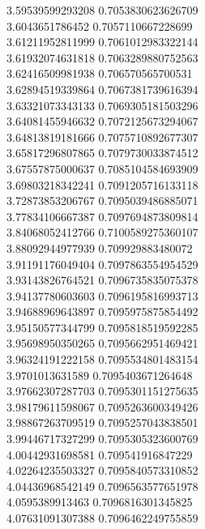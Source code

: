 {3.59539599293208 0.7053830623626709 \\
3.6043651786452 0.7057110667228699 \\
3.61211952811999 0.7061012983322144 \\
3.61932074631818 0.7063289880752563 \\
3.62416509981938 0.706570565700531 \\
3.62894519339864 0.7067381739616394 \\
3.63321073343133 0.7069305181503296 \\
3.64081455946632 0.7072125673294067 \\
3.64813819181666 0.7075710892677307 \\
3.65817296807865 0.7079730033874512 \\
3.67557875000637 0.7085104584693909 \\
3.69803218342241 0.7091205716133118 \\
3.72873853206767 0.7095039486885071 \\
3.77834106667387 0.7097694873809814 \\
3.84068052412766 0.7100589275360107 \\
3.88092944977939 0.709929883480072 \\
3.91191176049404 0.7097863554954529 \\
3.93143826764521 0.7096735835075378 \\
3.94137780603603 0.7096195816993713 \\
3.94688969643897 0.7095975875854492 \\
3.95150577344799 0.7095818519592285 \\
3.95698950350265 0.7095662951469421 \\
3.96324191222158 0.7095534801483154 \\
3.9701013631589 0.7095403671264648 \\
3.97662307287703 0.7095301151275635 \\
3.98179611598067 0.7095263600349426 \\
3.98867263709519 0.7095257043838501 \\
3.99446717327299 0.7095305323600769 \\
4.00442931698581 0.709541916847229 \\
4.02264235503327 0.7095840573310852 \\
4.04436968542149 0.7096563577651978 \\
4.0595389913463 0.7096816301345825 \\
4.07631091307388 0.7096462249755859 \\
}
